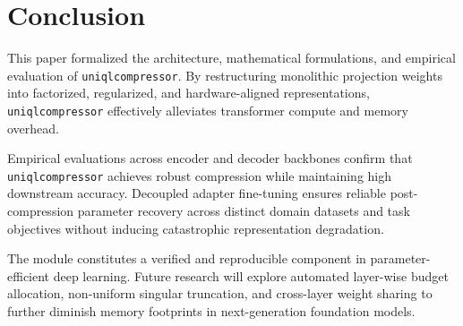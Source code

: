\section{Conclusion}
This paper formalized the architecture, mathematical formulations, and empirical evaluation of \texttt{uniqlcompressor}. By restructuring monolithic projection weights into factorized, regularized, and hardware-aligned representations, \texttt{uniqlcompressor} effectively alleviates transformer compute and memory overhead.

Empirical evaluations across encoder and decoder backbones confirm that \texttt{uniqlcompressor} achieves robust compression while maintaining high downstream accuracy. Decoupled adapter fine-tuning ensures reliable post-compression parameter recovery across distinct domain datasets and task objectives without inducing catastrophic representation degradation.

The module constitutes a verified and reproducible component in parameter-efficient deep learning. Future research will explore automated layer-wise budget allocation, non-uniform singular truncation, and cross-layer weight sharing to further diminish memory footprints in next-generation foundation models.
